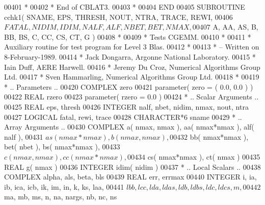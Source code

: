 \begin{DoxyCode}
00401 \textcolor{comment}{*}
00402 \textcolor{comment}{*     End of CBLAT3.}
00403 \textcolor{comment}{*}
00404 \textcolor{keyword}{      END}
00405 \textcolor{keyword}{      SUBROUTINE }cchk1( SNAME, EPS, THRESH, NOUT, NTRA, TRACE, REWI,
00406      $                  FATAL, NIDIM, IDIM, NALF, ALF, NBET, BET, NMAX,
00407      $                  A, AA, AS, B, BB, BS, C, CC, CS, CT, G )
00408 \textcolor{comment}{*}
00409 \textcolor{comment}{*  Tests CGEMM.}
00410 \textcolor{comment}{*}
00411 \textcolor{comment}{*  Auxiliary routine for test program for Level 3 Blas.}
00412 \textcolor{comment}{*}
00413 \textcolor{comment}{*  -- Written on 8-February-1989.}
00414 \textcolor{comment}{*     Jack Dongarra, Argonne National Laboratory.}
00415 \textcolor{comment}{*     Iain Duff, AERE Harwell.}
00416 \textcolor{comment}{*     Jeremy Du Croz, Numerical Algorithms Group Ltd.}
00417 \textcolor{comment}{*     Sven Hammarling, Numerical Algorithms Group Ltd.}
00418 \textcolor{comment}{*}
00419 \textcolor{comment}{*     .. Parameters ..}
00420       \textcolor{keywordtype}{COMPLEX}            zero
00421       parameter( zero = ( 0.0, 0.0 ) )
00422       \textcolor{keywordtype}{REAL}               rzero
00423       parameter( rzero = 0.0 )
00424 \textcolor{comment}{*     .. Scalar Arguments ..}
00425       \textcolor{keywordtype}{REAL}               eps, thresh
00426       \textcolor{keywordtype}{INTEGER}            nalf, nbet, nidim, nmax, nout, ntra
00427       \textcolor{keywordtype}{LOGICAL}            fatal, rewi, trace
00428       \textcolor{keywordtype}{CHARACTER*6}        sname
00429 \textcolor{comment}{*     .. Array Arguments ..}
00430       \textcolor{keywordtype}{COMPLEX}            a( nmax, nmax ), aa( nmax*nmax ), alf( nalf ),
00431      $                   as( nmax*nmax ), b( nmax, nmax ),
00432      $                   bb( nmax*nmax ), bet( nbet ), bs( nmax*nmax ),
00433      $                   c( nmax, nmax ), cc( nmax*nmax ),
00434      $                   cs( nmax*nmax ), ct( nmax )
00435       \textcolor{keywordtype}{REAL}               g( nmax )
00436       \textcolor{keywordtype}{INTEGER}            idim( nidim )
00437 \textcolor{comment}{*     .. Local Scalars ..}
00438       \textcolor{keywordtype}{COMPLEX}            alpha, als, beta, bls
00439       \textcolor{keywordtype}{REAL}               err, errmax
00440       \textcolor{keywordtype}{INTEGER}            i, ia, ib, ica, icb, ik, im, in, k, ks, laa,
00441      $                   lbb, lcc, lda, ldas, ldb, ldbs, ldc, ldcs, m,
00442      $                   ma, mb, ms, n, na, nargs, nb, nc, ns

\end{DoxyCode}

